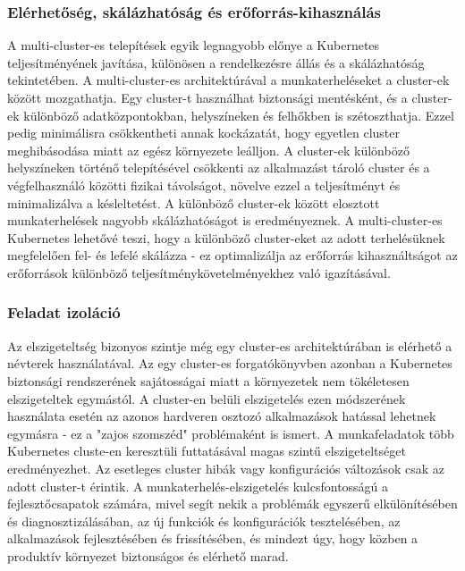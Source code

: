 \subsubsection*{Elérhetőség, skálázhatóság és erőforrás-kihasználás}
A multi-cluster-es telepítések egyik legnagyobb előnye a Kubernetes teljesítményének javítása, különösen a rendelkezésre állás és a skálázhatóság tekintetében. A multi-cluster-es architektúrával a munkaterheléseket a cluster-ek között mozgathatja. Egy cluster-t használhat biztonsági mentésként, és a cluster-ek különböző adatközpontokban, helyszíneken és felhőkben is szétoszthatja. Ezzel pedig minimálisra csökkentheti annak kockázatát, hogy egyetlen cluster meghibásodása miatt az egész környezete leálljon. A cluster-ek különböző helyszíneken történő telepítésével csökkenti az alkalmazást tároló cluster és a végfelhasználó közötti fizikai távolságot, növelve ezzel a teljesítményt és minimalizálva a késleltetést. A különböző cluster-ek között elosztott munkaterhelések nagyobb skálázhatóságot is eredményeznek. A multi-cluster-es Kubernetes lehetővé teszi, hogy a különböző cluster-eket az adott terhelésüknek megfelelően fel- és lefelé skálázza - ez optimalizálja az erőforrás kihasználtságot az erőforrások különböző teljesítménykövetelményekhez való igazításával.
\cite{multicluster}

\subsubsection*{Feladat izoláció}
Az elszigeteltség bizonyos szintje még egy cluster-es architektúrában is elérhető a névterek használatával. Az egy cluster-es forgatókönyvben azonban a Kubernetes biztonsági rendszerének sajátosságai miatt a környezetek nem tökéletesen elszigeteltek egymástól. A cluster-en belüli elszigetelés ezen módszerének használata esetén az azonos hardveren osztozó alkalmazások hatással lehetnek egymásra - ez a "zajos szomszéd" problémaként is ismert. A munkafeladatok több Kubernetes cluste-en keresztüli futtatásával magas szintű elszigeteltséget eredményezhet. Az esetleges cluster hibák vagy konfigurációs változások csak az adott cluster-t érintik. A munkaterhelés-elszigetelés kulcsfontosságú a fejlesztőcsapatok számára, mivel segít nekik a problémák egyszerű elkülönítésében és diagnosztizálásában, az új funkciók és konfigurációk tesztelésében, az alkalmazások fejlesztésében és frissítésében, és mindezt úgy, hogy közben a produktív környezet biztonságos és elérhető marad.
\cite{multicluster}

